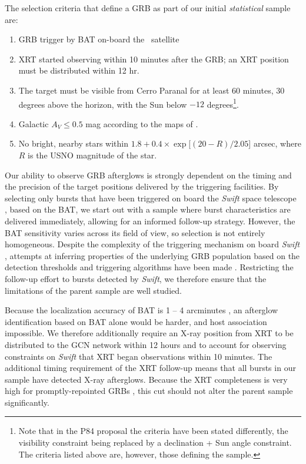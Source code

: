 \documentclass[longauth]{aa}    %
\begin{document}
The selection criteria that define a GRB as part of our initial \textit{statistical}
	sample are:

\begin{enumerate}
	
	\item GRB trigger by BAT on-board the \swift~satellite

	\item XRT started observing within 10 minutes after the GRB; an XRT position
	must be distributed within 12 hr.
	
	\item The target must be visible from Cerro Paranal for at least 60 minutes, 30
degrees above the horizon, with the Sun below $-12$ degrees\footnote{Note that
	in the P84 proposal the criteria have been stated differently, the visibility
	constraint being replaced by a declination + Sun angle constraint. The criteria
	listed above are, however, those defining the sample.}.

	\item Galactic $A_V \leq 0.5$ mag according to the maps of \citet{Schlegel1998}.
	
	\item No bright, nearby stars within $ 1.8 + 0.4 \times \exp[(20 - R)/2.05$]
arcsec, where $R$ is the USNO magnitude of the star.
	
\end{enumerate}

Our ability to observe GRB afterglows is strongly dependent on the timing and
the precision of the target positions delivered by the triggering facilities. By
selecting only bursts that have been triggered on board the \textit{Swift} space
telescope \citep{Gehrels2004}, based on the BAT, we start out with a sample
where burst characteristics are delivered immediately, allowing for an informed
follow-up strategy. However, the BAT sensitivity varies across its field of
view, so selection is not entirely homogeneous. Despite the complexity of the
triggering mechanism on board \textit{Swift} \citep{Band2006, Coward2013a},
attempts at inferring properties of the underlying GRB population based on the
detection thresholds and triggering algorithms have been made \citep{Lien2014,
	Graff2016}. Restricting the follow-up effort to bursts detected by
\textit{Swift}, we therefore ensure that the limitations of the parent sample
are well studied.

Because the localization accuracy of BAT is 1 -- 4 arcminutes
\citep{Barthelmy2005}, an afterglow identification based on BAT alone would be
harder, and  host association impossible. We therefore additionally require an
X-ray position from XRT to be distributed to the GCN network
\citep{Barthelmy2000} within 12 hours and to account for observing constraints
on \textit{Swift} that XRT began observations within 10 minutes. The additional
timing requirement of the XRT follow-up means that all bursts in our sample have
detected X-ray afterglows. Because the XRT completeness is very high for
promptly-repointed GRBs \citep{Burrows2007}, this cut should not alter the
parent sample significantly.
\end{document}
